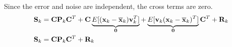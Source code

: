 Since the error and noise are independent, the cross terms are zero.
\begin{align*}
  \mathbf{S}_k &= \mathbf{C}\mathbf{P}_k\mathbf{C}^T +
    \mathbf{C}\underbrace{E[(\mathbf{x}_k - \overline{\mathbf{x}}_k)\mathbf{v}_k^T]}_{\mathbf{0}} +
    \underbrace{
      E[\mathbf{v}_k(\mathbf{x}_k - \overline{\mathbf{x}}_k)^T]}_{\mathbf{0}}\mathbf{C}^T + \mathbf{R}_k \\
  \mathbf{S}_k &= \mathbf{C}\mathbf{P}_k\mathbf{C}^T + \mathbf{R}_k
\end{align*}
